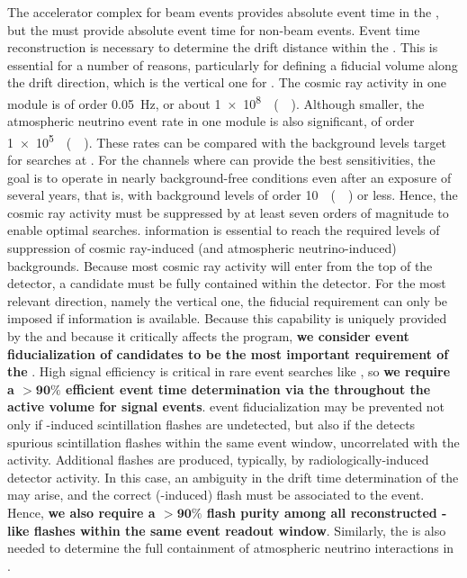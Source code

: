 The accelerator complex for beam events provides absolute event time in the \dune {}, but the  must provide absolute event time for non-beam events. Event time reconstruction is necessary to determine the drift distance within the . This is essential for a number of reasons, particularly for defining a fiducial volume along the  drift direction, which is the vertical one for . The cosmic ray activity in one  module is of order \SI{0.05}{\Hz}, or about \SI{1e8}{\per(\Mtyr)}. Although smaller, the atmospheric neutrino event rate in one  module is also significant, of order \SI{1e5}{\per(\Mtyr)}. These rates can be compared with the background levels target for  searches at \dune. For the  channels where \dune can provide the best sensitivities, the goal is to operate in nearly background-free conditions even after an exposure of several years, that is, with background levels of order \SI{10}{\per(\Mtyr)} or less. Hence, the cosmic ray activity must be suppressed by at least seven orders of magnitude to enable optimal  searches.  information is essential to reach the required levels of suppression of cosmic ray-induced (and atmospheric neutrino-induced) backgrounds. Because most cosmic ray activity will enter from the top of the detector, a  candidate must be fully contained within the detector. For the most relevant direction, namely the vertical one, the fiducial requirement can only be imposed if  information is available. Because this capability is uniquely provided by the  and because it critically affects the  program, {\bf we consider event fiducialization of  candidates to be the most important requirement of the }. High signal efficiency is critical in rare event searches like , so {\bf we require a $\boldsymbol{>90\%}$ efficient event time determination via the  throughout the  active volume for  signal events}.  event fiducialization may be prevented not only if -induced  scintillation flashes are undetected, but also if the  detects spurious  scintillation flashes within the same event window, uncorrelated with the  activity. Additional flashes are produced, typically, by radiologically-induced detector activity. In this case, an ambiguity in the drift time determination of the  may arise, and the correct (-induced) flash must be associated to the event. Hence, {\bf we also require a $\boldsymbol{>90\%}$  flash purity among all reconstructed -like flashes within the same  event readout window}. Similarly, the  is also needed to determine the full containment of atmospheric neutrino interactions in \dune.
 
